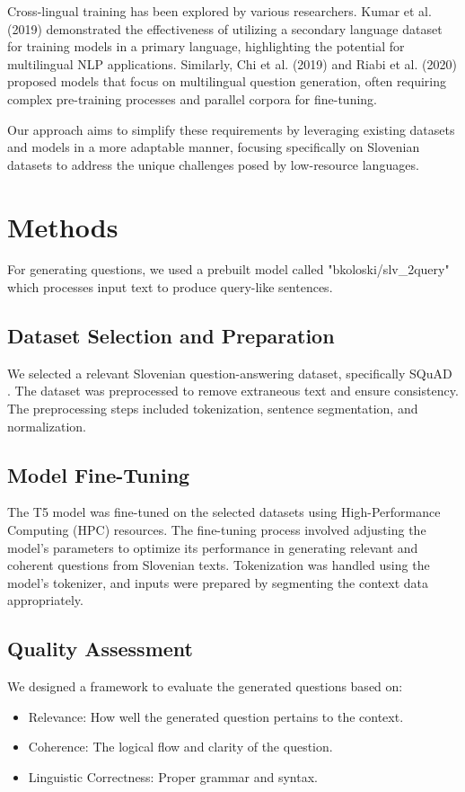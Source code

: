\documentclass[fleqn,moreauthors,10pt]{ds_report}
\begin{document}
Cross-lingual training has been explored by various researchers. Kumar et al. (2019) \cite{kumar2019cross} demonstrated the effectiveness of utilizing a secondary language dataset for training models in a primary language, highlighting the potential for multilingual NLP applications. Similarly, Chi et al. (2019) \cite{chi2019cross} and Riabi et al. (2020) \cite{riabi2020multilingual} proposed models that focus on multilingual question generation, often requiring complex pre-training processes and parallel corpora for fine-tuning.

Our approach aims to simplify these requirements by leveraging existing datasets and models in a more adaptable manner, focusing specifically on Slovenian datasets to address the unique challenges posed by low-resource languages.



\section*{Methods}
For generating questions, we used a prebuilt model called "bkoloski/slv\_2query" which processes input text to produce query-like sentences.

\subsection*{Dataset Selection and Preparation}
We selected a relevant Slovenian question-answering dataset, specifically SQuAD \cite{rajpurkar2016squad}. The dataset was preprocessed to remove extraneous text and ensure consistency. The preprocessing steps included tokenization, sentence segmentation, and normalization.

\subsection*{Model Fine-Tuning}
The T5 model \cite{raffel2020exploring} was fine-tuned on the selected datasets using High-Performance Computing (HPC) resources. The fine-tuning process involved adjusting the model’s parameters to optimize its performance in generating relevant and coherent questions from Slovenian texts. Tokenization was handled using the model’s tokenizer, and inputs were prepared by segmenting the context data appropriately.

\subsection*{Quality Assessment}
We designed a framework to evaluate the generated questions based on:
\begin{itemize}[noitemsep]
    \item Relevance: How well the generated question pertains to the context.
    \item Coherence: The logical flow and clarity of the question.
    \item Linguistic Correctness: Proper grammar and syntax.
\end{itemize}
\end{document}
